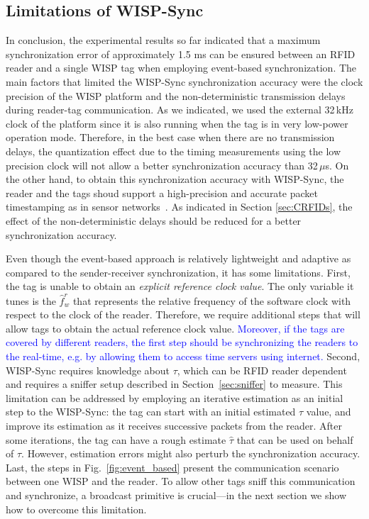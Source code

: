 \documentclass[10pt,journal,compsoc]{IEEEtran}
\newcommand{\add}[1]{\textcolor{blue}{#1}}
\begin{document}
\subsection{Limitations of WISP-Sync}

In conclusion, the experimental results so far indicated that a maximum synchronization error of approximately 1.5 ms can be ensured between an RFID reader and a single WISP tag when employing event-based synchronization. The main factors that limited the WISP-Sync synchronization accuracy were the clock precision of the WISP platform and the non-deterministic transmission delays during reader-tag communication. As we indicated, we used the external 32\,kHz clock of the platform since it is also running when the tag is in very low-power operation mode. Therefore, in the best case when there are no transmission delays, the quantization effect due to the timing measurements using the low precision clock will not allow a better synchronization accuracy than 32\,$\mu$s. On the other hand, to obtain this synchronization accuracy with WISP-Sync, the reader and the tags shoud support a high-precision and accurate packet timestamping as in sensor networks~\cite{Maroti2004}. As indicated in Section \ref{sec:CRFIDs}, the effect of the non-deterministic delays should be reduced for a better synchronization accuracy.

Even though the event-based approach is relatively lightweight and adaptive as compared to the sender-receiver synchronization, it has some limitations. First, the tag is unable to obtain an \emph{explicit reference clock value}. The only variable it tunes is the $\hat{f}_w^r$ that represents the relative frequency of the software clock with respect to the clock of the reader. Therefore, we require additional steps that will allow tags to obtain the actual reference clock value. \add{Moreover, if the tags are covered by different readers, the first step should be synchronizing the readers to the real-time, e.g. by allowing them to access time servers using internet.}
Second, WISP-Sync requires knowledge about $\tau$, which can be RFID reader dependent and requires a sniffer setup described in Section~\ref{sec:sniffer} to measure. This limitation can be addressed by employing an iterative estimation as an initial step to the WISP-Sync: the tag can start with an initial estimated $\tau$ value, and improve its estimation as it receives successive packets from the reader. After some iterations, the tag can have a rough estimate $\hat{\tau}$ that can be used on behalf of $\tau$. However, estimation errors might also perturb the synchronization accuracy. Last, the steps in Fig.~\ref{fig:event_based} present the communication scenario between one WISP and the reader. To allow other tags sniff this communication and synchronize, a broadcast primitive is crucial---in the next section we show how to overcome this limitation.
\end{document}
